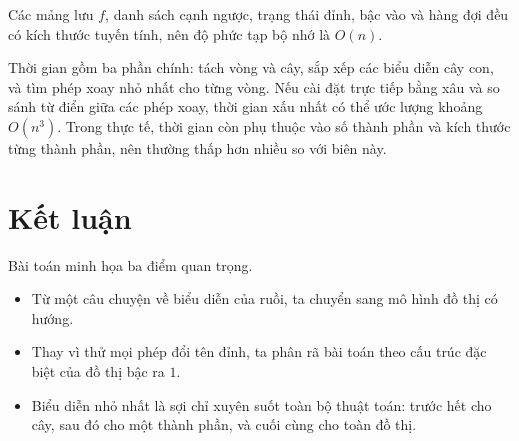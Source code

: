\documentclass[11pt]{article}
\begin{document}
Các mảng lưu \(f\), danh sách cạnh ngược, trạng thái đỉnh, bậc vào và hàng đợi
đều có kích thước tuyến tính, nên độ phức tạp bộ nhớ là \(O(n)\).

Thời gian gồm ba phần chính: tách vòng và cây, sắp xếp các biểu diễn cây con,
và tìm phép xoay nhỏ nhất cho từng vòng. Nếu cài đặt trực tiếp bằng xâu và so
sánh từ điển giữa các phép xoay, thời gian xấu nhất có thể ước lượng khoảng
\(O(n^3)\). Trong thực tế, thời gian còn phụ thuộc vào số thành phần và kích
thước từng thành phần, nên thường thấp hơn nhiều so với biên này.

\section{Kết luận}

Bài toán minh họa ba điểm quan trọng.

\begin{itemize}
  \item Từ một câu chuyện về biểu diễn của ruồi, ta chuyển sang mô hình đồ thị
  có hướng.
  \item Thay vì thử mọi phép đổi tên đỉnh, ta phân rã bài toán theo cấu trúc
  đặc biệt của đồ thị bậc ra \(1\).
  \item Biểu diễn nhỏ nhất là sợi chỉ xuyên suốt toàn bộ thuật toán: trước hết
  cho cây, sau đó cho một thành phần, và cuối cùng cho toàn đồ thị.
\end{itemize}
\end{document}

